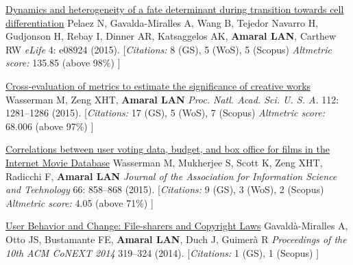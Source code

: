 \NumberedItem{\makebox[0.8cm][r]{[110]}}
\href{/people/amaral/dynamics-and-heterogeneity-fate-determinant-during-transition-towards-cell-differentiation}
{Dynamics and heterogeneity of a fate determinant during transition towards cell differentiation}
\newline
Pelaez N, Gavalda-Miralles A, Wang B, Tejedor Navarro H, Gudjonson H, Rebay I, Dinner AR, Katsaggelos AK, {\textbf{Amaral LAN}}, Carthew RW
\newline
\textit{eLife}
    4:
e08924 (2015).
    \newline
    \hfill [{\em{Citations:}} 8 (GS),
    5 (WoS), 5 (Scopus)
        {\hspace*{1cm} \em{Altmetric score:}}  135.85 (above 98\%)
    ]
\newline
\Gap
~
\Gap

\NumberedItem{\makebox[0.8cm][r]{[109]}}
\href{/people/amaral/cross-evaluation-metrics-estimate-significance-creative-works}
{Cross-evaluation of metrics to estimate the significance of creative works}
\newline
Wasserman M, Zeng XHT, {\textbf{Amaral LAN}}
\newline
\textit{Proc. Natl. Acad. Sci. U. S. A.}
    112:
1281--1286 (2015).
    \newline
    \hfill [{\em{Citations:}} 17 (GS),
    5 (WoS), 7 (Scopus)
        {\hspace*{1cm} \em{Altmetric score:}}  68.006 (above 97\%)
    ]
\newline
\Gap
~
\Gap

\NumberedItem{\makebox[0.8cm][r]{[108]}}
\href{/people/amaral/correlations-between-user-voting-data-budget-and-box-office-films-internet-movie-database}
{Correlations between user voting data, budget, and box office for films in the Internet Movie Database}
\newline
Wasserman M, Mukherjee S, Scott K, Zeng XHT, Radicchi F, {\textbf{Amaral LAN}}
\newline
\textit{Journal of the Association for Information Science and Technology}
    66:
858--868 (2015).
    \newline
    \hfill [{\em{Citations:}} 9 (GS),
    3 (WoS), 2 (Scopus)
        {\hspace*{1cm} \em{Altmetric score:}}  4.05 (above 71\%)
    ]
\newline
\Gap
~
\Gap

\NumberedItem{\makebox[0.8cm][r]{[107]}}
\href{/people/amaral/user-behavior-and-change-file-sharers-and-copyright-laws}
{User Behavior and Change: File-sharers and Copyright Laws}
\newline
Gavald\`a-Miralles A, Otto JS, Bustamante FE, {\textbf{Amaral LAN}}, Duch J, Guimer\`a R
\newline
\textit{Proceedings of the 10th ACM CoNEXT 2014}
319--324 (2014).
    \newline
    \hfill [{\em{Citations:}} 1 (GS), 1 (Scopus)
    ]
\newline
\Gap
~
\Gap

